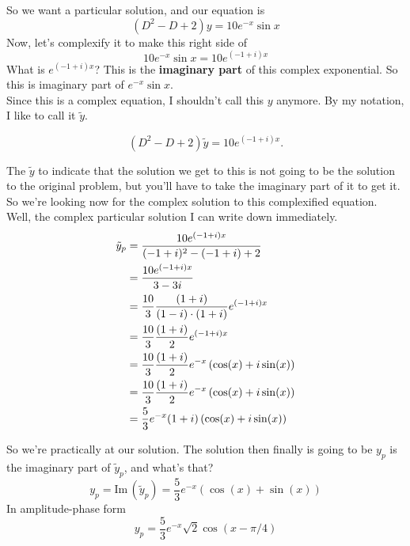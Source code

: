So we want a particular solution, and our equation is
\begin{equation*}
  (D^2 -D +2)y = 10e^{-x} \sin x
\end{equation*}
Now, let's complexify it to make this right side of
\begin{equation*}
  10e^{-x} \sin x = 10 e^{(-1 + i)x}
\end{equation*}
What is $e^{(-1 + i)x}$? This is the \textbf{imaginary part} of this complex exponential.
So this is imaginary part of $e^{-x} \sin x$. \\

Since this is a complex equation, I shouldn't call this $y$ anymore.
By my notation, I like to call it $\tilde y$.

\begin{equation*}
  (D^2 -D +2) \tilde y = 10 e^{(-1 + i)x}.
\end{equation*}

The $\tilde y$ to indicate that the solution we get to this is not going to be the solution to the original problem, but you'll have to take the imaginary part of it to get it.\\
So we're looking now for the complex solution to this complexified equation.
Well, the complex particular solution I can write down immediately.
\begin{align*}
  \displaystyle \tilde y_ p
  \displaystyle &= \frac{10 e^{(-1 + i)x}}{(-1 + i)^2 - (-1 + i) + 2} \\
  \displaystyle &= \frac{10 e^{(-1 + i)x}}{3 -3i} \\
  \displaystyle &= \frac{10}{3} \frac{(1 + i)}{(1 - i) \cdot (1 + i)} e^{(-1 + i)x} \\
  \displaystyle &= \frac{10}{3} \frac{(1 + i)}{2} e^{(-1 + i)x} \\
  \displaystyle &= \frac{10}{3} \frac{(1 + i)}{2} e^{-x} \left( \cos (x) + i \sin (x) \right) \\
  \displaystyle &= \frac{10}{3} \frac{(1 + i)}{2} e^{-x} \left( \cos (x) + i \sin (x) \right) \\
  \displaystyle &= \frac{5}{3}  e^{-x} (1 + i) \left( \cos (x) + i \sin (x) \right) 
\end{align*}

So we're practically at our solution.
The solution then finally is going to be $y_p $ is the imaginary part of $\tilde y_ p$, and what's that?
\begin{equation*}
  y_ p = \mathrm{Im\, } \left( \tilde y_ p \right)
  = \frac{5}{3}  e^{-x} \left(\cos (x) + \sin (x) \right)   
\end{equation*}
In amplitude-phase form
\begin{equation*}
  y_ p = \frac{5}{3} e^{-x} \sqrt{2} \cos (x - \pi / 4)
\end{equation*}

